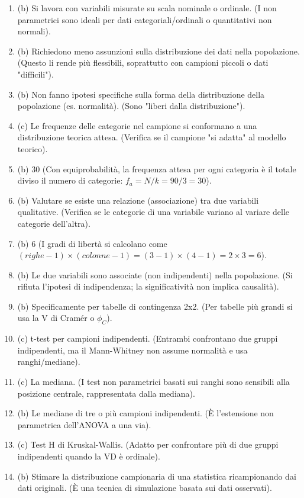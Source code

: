 \documentclass[12pt, a4paper]{article}
\newcommand{\fa}{f_a} %
\newcommand{\phiCramer}{\phi_C} %
\begin{document}
\begin{enumerate}[leftmargin=*, label=\arabic*.]
    \item (b) Si lavora con variabili misurate su scala nominale o ordinale. (I non parametrici sono ideali per dati categoriali/ordinali o quantitativi non normali).
    \item (b) Richiedono meno assunzioni sulla distribuzione dei dati nella popolazione. (Questo li rende più flessibili, soprattutto con campioni piccoli o dati "difficili").
    \item (b) Non fanno ipotesi specifiche sulla forma della distribuzione della popolazione (es. normalità). (Sono "liberi dalla distribuzione").
    \item (c) Le frequenze delle categorie nel campione si conformano a una distribuzione teorica attesa. (Verifica se il campione "si adatta" al modello teorico).
    \item (b) 30 (Con equiprobabilità, la frequenza attesa per ogni categoria è il totale diviso il numero di categorie: $\fa = N/k = 90/3 = 30$).
    \item (b) Valutare se esiste una relazione (associazione) tra due variabili qualitative. (Verifica se le categorie di una variabile variano al variare delle categorie dell'altra).
    \item (b) 6 (I gradi di libertà si calcolano come $(righe - 1) \times (colonne - 1) = (3-1) \times (4-1) = 2 \times 3 = 6$).
    \item (b) Le due variabili sono associate (non indipendenti) nella popolazione. (Si rifiuta l'ipotesi di indipendenza; la significatività non implica causalità).
    \item (b) Specificamente per tabelle di contingenza 2x2. (Per tabelle più grandi si usa la V di Cramér o $\phiCramer$).
    \item (c) t-test per campioni indipendenti. (Entrambi confrontano due gruppi indipendenti, ma il Mann-Whitney non assume normalità e usa ranghi/mediane).
    \item (c) La mediana. (I test non parametrici basati sui ranghi sono sensibili alla posizione centrale, rappresentata dalla mediana).
    \item (b) Le mediane di tre o più campioni indipendenti. (È l'estensione non parametrica dell'ANOVA a una via).
    \item (c) Test H di Kruskal-Wallis. (Adatto per confrontare più di due gruppi indipendenti quando la VD è ordinale).
    \item (b) Stimare la distribuzione campionaria di una statistica ricampionando dai dati originali. (È una tecnica di simulazione basata sui dati osservati).

\end{enumerate}
\end{document}
